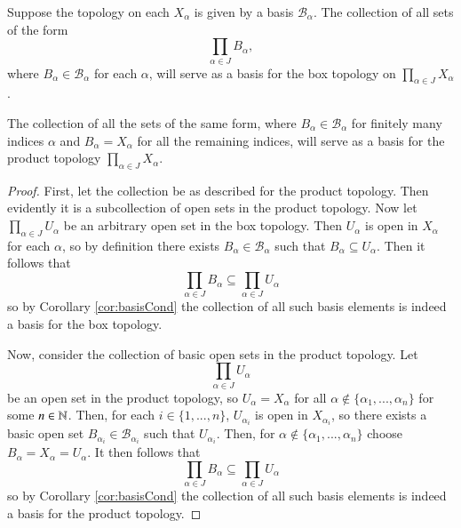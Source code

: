 \documentclass[12pt, a4paper, oneside, openright, titlepage]{book}
\begin{document}
\begin{thm}
    Suppose the topology on each $X_{\alpha}$ is given by a basis $\mathcal{B}_{\alpha}$. The collection of all sets of the form \begin{equation*}
        \prod\limits_{\alpha \in J}B_{\alpha},
    \end{equation*}
    where $B_{\alpha} \in \mathcal{B}_{\alpha}$ for each $\alpha$, will serve as a basis for the box topology on $\prod_{\alpha \in J}X_{\alpha}$.

    The collection of all the sets of the same form, where $B_{\alpha} \in \mathcal{B}_{\alpha}$ for finitely many indices $\alpha$ and $B_{\alpha} = X_{\alpha}$ for all the remaining indices, will serve as a basis for the product topology $\prod_{\alpha \in J}X_{\alpha}$.
\end{thm}
\begin{proof}
    First, let the collection be as described for the product topology. Then evidently it is a subcollection of open sets in the product topology. Now let $\prod_{\alpha \in J}U_{\alpha}$ be an arbitrary open set in the box topology. Then $U_{\alpha}$ is open in $X_{\alpha}$ for each $\alpha$, so by definition there exists $B_{\alpha} \in \mathcal{B}_{\alpha}$ such that $B_{\alpha} \subseteq U_{\alpha}$. Then it follows that \begin{equation*}
        \prod\limits_{\alpha \in J}B_{\alpha} \subseteq \prod\limits_{\alpha \in J}U_{\alpha}
    \end{equation*}
    so by Corollary \ref{cor:basisCond} the collection of all such basis elements is indeed a basis for the box topology.

    Now, consider the collection of basic open sets in the product topology. Let $$\prod\limits_{\alpha \in J}U_{\alpha}$$ be an open set in the product topology, so $U_{\alpha} = X_{\alpha}$ for all $\alpha \notin \{\alpha_1,...,\alpha_n\}$ for some $n \in \mathbb N$. Then, for each $i \in \{1,...,n\}$, $U_{\alpha_i}$ is open in $X_{\alpha_i}$, so there exists a basic open set $B_{\alpha_i} \in \mathcal{B}_{\alpha_i}$ such that $U_{\alpha_i}$. Then, for $\alpha \notin \{\alpha_1,...,\alpha_n\}$ choose $B_{\alpha} = X_{\alpha} = U_{\alpha}$. It then follows that \begin{equation*}
        \prod\limits_{\alpha \in J}B_{\alpha} \subseteq \prod\limits_{\alpha \in J}U_{\alpha}
    \end{equation*}
    so by Corollary \ref{cor:basisCond} the collection of all such basis elements is indeed a basis for the product topology.
\end{proof}
\end{document}
